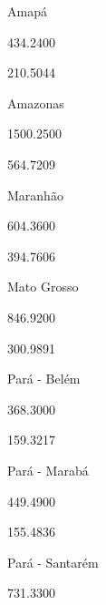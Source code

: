 \documentclass[
  letterpaper,
]{report}
\begin{document}
\n      

Amapá

\n      

434.2400

\n      

210.5044

\n    

\n    

\n      

Amazonas

\n      

1500.2500

\n      

564.7209

\n    

\n    

\n      

Maranhão

\n      

604.3600

\n      

394.7606

\n    

\n    

\n      

Mato Grosso

\n      

846.9200

\n      

300.9891

\n    

\n    

\n      

Pará - Belém

\n      

368.3000

\n      

159.3217

\n    

\n    

\n      

Pará - Marabá

\n      

449.4900

\n      

155.4836

\n    

\n    

\n      

Pará - Santarém

\n      

731.3300

\n      
\end{document}
